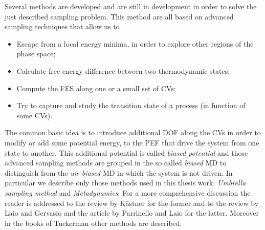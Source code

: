 Several methods are developed and are still in development in order to solve the just described sampling problem. This method are all based on advanced sampling techniques that allow us to
\begin{itemize}
	\item Escape from a local energy minima, in order to explore other regions of the phase space;
	\item Calculate free energy difference between two thermodynamic states;
	\item Compute the \ac{FES} along one or a small set of \acp{CV};
	\item Try to capture and study the transition state of a process (in function of some \acp{CV}).
\end{itemize}
The common basic idea is to introduce additional \ac{DOF} along the \acp{CV} in order to modify or add some potential energy, to the \ac{PEF} that drive the system from one state to another. This additional potential is called \textit{biased potential} and those advanced sampling methods are grouped in the so called \textit{biased} \ac{MD} to distinguish from the \textit{un--biased} \ac{MD} in which the system is not driven. In particular we describe only those methods used in this thesis work: \textit{Umbrella sampling method} and \textit{Metadynamics}. For a more comprehensive discussion the reader is addressed to the review by Kästner \cite{Umbrella} for the former and to the review by Laio and Gervasio \cite{MetadReview} and the article by Parrinello and Laio \cite{MetadParrinello} for the latter. Moreover in the books of Tuckerman \cite{Tuckerman} other methods are described.



